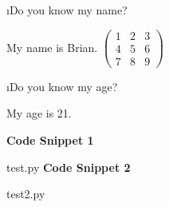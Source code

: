 \documentclass[fleqn]{article}
\begin{document}
\bee
\i Do you know my name?
\begin{tcolorbox}
My name is Brian. \newline  \newline  $\begin{pmatrix}
1 & 2 & 3\\
4 & 5 & 6\\
7 & 8 & 9
\end{pmatrix}$

\end{tcolorbox}
\i Do you know my age?
\begin{tcolorbox}
My age is 21.
\end{tcolorbox}
\ene
\leavevmode\newline
\textbf{Code Snippet 1}

{test.py}
\textbf{Code Snippet 2}

{test2.py}
\end{document}
